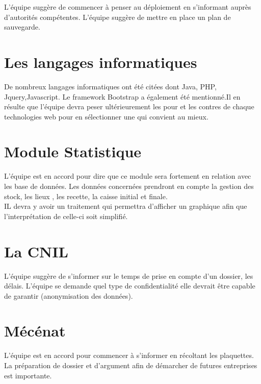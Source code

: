 \documentclass [a4paper] {article}
\begin{document}
L'équipe suggère de commencer à penser au déploiement en s'informant auprès d’autorités compétentes.
L'équipe suggère de mettre en place un plan de sauvegarde. 


\section{Les langages informatiques}
De nombreux langages informatiques ont été citées dont Java, PHP, Jquery,Javascript.
Le framework Bootstrap a également été mentionné.Il en résulte que l'équipe devra peser ultérieurement les pour et les contres de chaque technologies web pour en sélectionner une qui convient au mieux.
\\


\section{Module Statistique}
L'équipe est en accord pour dire que ce module sera fortement en relation avec les base de données. Les données concernées prendront en compte la gestion des stock, les lieux , les recette, la caisse initial et finale. \\
IL devra y avoir un traitement  qui permettra d'afficher un graphique afin que l'interprétation de celle-ci soit simplifié.

\section{La CNIL}
L'équipe suggère de s'informer sur le temps de prise en compte d'un dossier, les délais. L'équipe se demande quel type de confidentialité elle devrait être capable de garantir (anonymisation des données).
\\

\section{Mécénat}

L'équipe est en accord pour commencer à s'informer en récoltant les plaquettes. La préparation de dossier et d'argument afin de démarcher de futures entreprises est importante.

\end{document}
